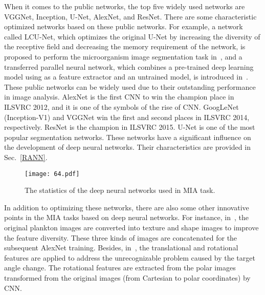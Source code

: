 When it comes to the public networks, the top five widely used networks are VGGNet, Inception, U-Net, AlexNet, and ResNet. There are some characteristic optimized networks based on these public networks. For example, a network called LCU-Net, which optimizes the original U-Net by increasing the diversity of the receptive field and decreasing the memory requirement of the network, is proposed to perform the microorganism image segmentation task in~\cite{Zhang-2020-AMCF,Zhang-2021-LANL}, and a transferred parallel neural network, which combines a pre-trained deep learning model using as a feature extractor and an untrained model, is introduced in~\cite{Wang-2018-TPCN}. These public networks can be widely used due to their outstanding performance in image analysis. AlexNet is the first CNN to win the champion place in ILSVRC 2012, and it is one of the symbols of the rise of CNN. GoogLeNet (Inception-V1) and VGGNet win the first and second places in ILSVRC 2014, respectively. ResNet is the champion in ILSVRC 2015. U-Net is one of the most popular segmentation networks. These networks have a significant influence on the development of deep neural networks. Their characteristics are provided in Sec.~\ref{RANN}.


\begin{figure}[htbp!]
\centering
\texttt{[image: 64.pdf]}
\caption{The statistics of the deep neural networks used in MIA task.}
\label{fig64}
\end{figure}

In addition to optimizing these networks, there are also some other innovative points in the MIA tasks based on deep neural networks. For instance, in~\cite{Cui-2018-TSIF}, the original plankton images are converted into texture and shape images to improve the feature diversity. These three kinds of images are concatenated for the subsequent AlexNet training. Besides, in~\cite{Cheng-2020-MTCN}, the translational and rotational features are applied to address the unrecognizable problem caused by the target angle change. The rotational features are extracted from the polar images transformed from the original images (from Cartesian to polar coordinates) by CNN.

